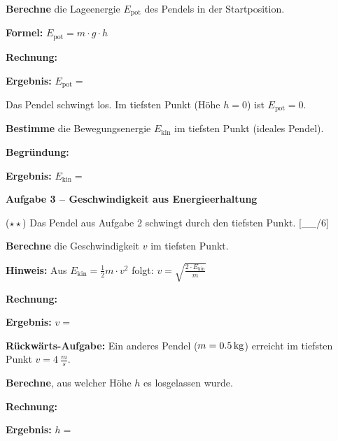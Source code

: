 \documentclass[11pt, a4paper]{article}
\newcommand{\luecke}[1]{\underline{\hspace{#1}}}
\newcommand{\punktebox}[1]{\hfill\small\textcolor{mittelgrau}{[\_\_/#1]}}
\newcommand{\aufgabe}[1]{%
    \needspace{4\baselineskip}%
    \vspace{10pt}%
    \noindent\textbf{\textcolor{fachfarbe}{Aufgabe #1}}%
    \vspace{4pt}%
    \nopagebreak[4]%
}
\newcommand{\operator}[1]{\textbf{\textcolor{fachfarbe}{#1}}}
\begin{document}
\begin{teil}
\item \operator{Berechne} die Lageenergie $E_\text{pot}$ des Pendels in der Startposition.

\vspace{4pt}
\textbf{Formel:} $E_\text{pot} = m \cdot g \cdot h$

\vspace{6pt}
\textbf{Rechnung:}

\vspace{2.5em}

\textbf{Ergebnis:} $E_\text{pot} = $ \luecke{2cm}

\vspace{4pt}

\item Das Pendel schwingt los. Im tiefsten Punkt (Höhe $h = 0$) ist $E_\text{pot} = 0$.

\operator{Bestimme} die Bewegungsenergie $E_\text{kin}$ im tiefsten Punkt (ideales Pendel).

\vspace{6pt}
\textbf{Begründung:}

\vspace{2em}

\textbf{Ergebnis:} $E_\text{kin} = $ \luecke{2cm}
\end{teil}

\vspace{0.5em}

\aufgabe{3 – Geschwindigkeit aus Energieerhaltung}

($\star\star$) Das Pendel aus Aufgabe 2 schwingt durch den tiefsten Punkt. \punktebox{6}

\begin{teil}
\item \operator{Berechne} die Geschwindigkeit $v$ im tiefsten Punkt.

\vspace{4pt}
\textbf{Hinweis:} Aus $E_\text{kin} = \frac{1}{2} m \cdot v^2$ folgt: $v = \sqrt{\frac{2 \cdot E_\text{kin}}{m}}$

\vspace{6pt}
\textbf{Rechnung:}

\vspace{3em}

\textbf{Ergebnis:} $v = $ \luecke{2cm}

\vspace{4pt}

\item \textbf{Rückwärts-Aufgabe:} Ein anderes Pendel ($m = \SI{0{,}5}{kg}$) erreicht im tiefsten Punkt $v = \SI{4}{\frac{m}{s}}$.

\operator{Berechne}, aus welcher Höhe $h$ es losgelassen wurde.

\vspace{6pt}
\textbf{Rechnung:}

\vspace{3em}

\textbf{Ergebnis:} $h = $ \luecke{2cm}
\end{teil}
\end{document}
